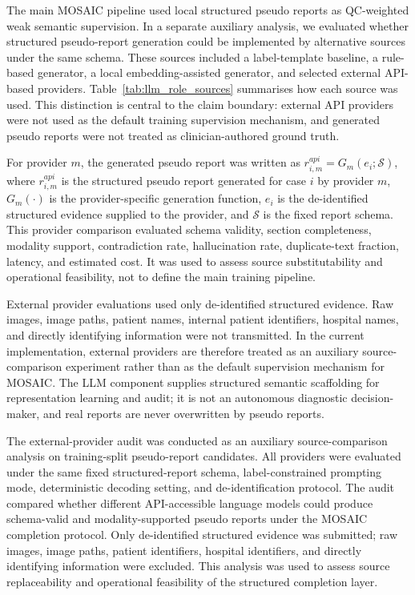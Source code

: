\documentclass[11pt, a4paper]{article}
\theoremstyle{plain}
\theoremstyle{definition}
\begin{document}
The main MOSAIC pipeline used local structured pseudo reports as QC-weighted weak semantic supervision. In a separate auxiliary analysis, we evaluated whether structured pseudo-report generation could be implemented by alternative sources under the same schema. These sources included a label-template baseline, a rule-based generator, a local embedding-assisted generator, and selected external API-based providers. Table~\ref{tab:llm_role_sources} summarises how each source was used. This distinction is central to the claim boundary: external API providers were not used as the default training supervision mechanism, and generated pseudo reports were not treated as clinician-authored ground truth.

For provider \(m\), the generated pseudo report was written as \(r_{i,m}^{api}=G_m(e_i;\mathcal{S})\), where \(r_{i,m}^{api}\) is the structured pseudo report generated for case \(i\) by provider \(m\), \(G_m(\cdot)\) is the provider-specific generation function, \(e_i\) is the de-identified structured evidence supplied to the provider, and \(\mathcal{S}\) is the fixed report schema. This provider comparison evaluated schema validity, section completeness, modality support, contradiction rate, hallucination rate, duplicate-text fraction, latency, and estimated cost. It was used to assess source substitutability and operational feasibility, not to define the main training pipeline.

External provider evaluations used only de-identified structured evidence. Raw images, image paths, patient names, internal patient identifiers, hospital names, and directly identifying information were not transmitted. In the current implementation, external providers are therefore treated as an auxiliary source-comparison experiment rather than as the default supervision mechanism for MOSAIC. The LLM component supplies structured semantic scaffolding for representation learning and audit; it is not an autonomous diagnostic decision-maker, and real reports are never overwritten by pseudo reports.

The external-provider audit was conducted as an auxiliary source-comparison analysis on training-split pseudo-report candidates. All providers were evaluated under the same fixed structured-report schema, label-constrained prompting mode, deterministic decoding setting, and de-identification protocol. The audit compared whether different API-accessible language models could produce schema-valid and modality-supported pseudo reports under the MOSAIC completion protocol. Only de-identified structured evidence was submitted; raw images, image paths, patient identifiers, hospital identifiers, and directly identifying information were excluded. This analysis was used to assess source replaceability and operational feasibility of the structured completion layer.
\end{document}
